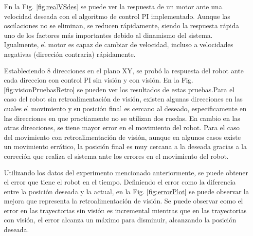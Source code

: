 \documentclass[twocolumn,10pt]{amrob}
\begin{document}
En la Fig. \ref{fig:realVSdes} se puede ver la respuesta de un motor ante una velocidad deseada con el algoritmo de control PI implementado. Aunque las oscilaciones no se eliminan, se reducen rápidamente, siendo la respuesta rápida uno de los factores más importantes debido al dinamismo del sistema. Igualmente, el motor es capaz de cambiar de velocidad, incluso a velocidades negativas (dirección contraria) rápidamente. \par
Estableciendo 8 direcciones en el plano XY, se probó la respuesta del robot ante cada direccion con control PI sin visión y con visión. En la Fig. \ref{fig:visionPruebasRetro} se pueden ver los resultados de estas pruebas.Para el caso del robot sin retroalimentación de visión, existen algunas direcciones en las cuales el movimiento y su posición final es cercano al deseado, especificamente en las direcciones en que practiamente no se utilizan dos ruedas. En cambio en las otras direcciones, se tiene mayor error en el movimiento del robot. Para el caso del movimiento con retroalimentación de visión, aunque en algunos casos existe un movimiento errático, la posición final es muy cercana a la deseada gracias a la correción que realiza el sistema ante los errores en el movimiento del robot. \par
Utilizando los datos del experimento mencionado anteriormente, se puede obtener el error que tiene el robot en el tiempo. Definiendo el error como la diferencia entre la posición deseada y la actual, en la Fig. \ref{fig:errorPlot} se puede observar la mejora que representa la retroalimentación de visión. Se puede observar como el error en las trayectorias sin visión es incremental mientras que en las trayectorias con visión, el error alcanza un máximo para disminuir, alcanzando la posición deseada.
\end{document}
